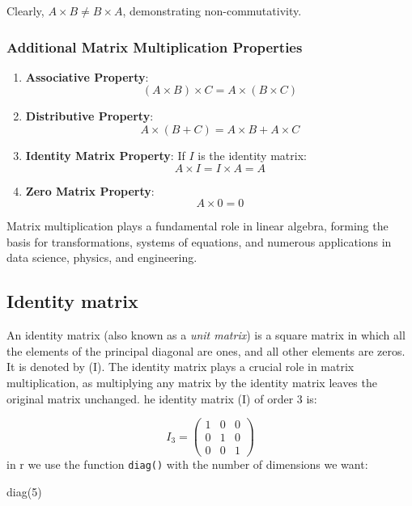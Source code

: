 \documentclass[
  letterpaper,
  DIV=11,
  numbers=noendperiod]{scrartcl}
\newenvironment{Shaded}{\begin{snugshade}}{\end{snugshade}}
\newcommand{\DecValTok}[1]{\textcolor[rgb]{0.68,0.00,0.00}{#1}}
\newcommand{\FunctionTok}[1]{\textcolor[rgb]{0.28,0.35,0.67}{#1}}
\newcommand{\NormalTok}[1]{\textcolor[rgb]{0.00,0.23,0.31}{#1}}
\providecommand{\tightlist}{%
  \setlength{\itemsep}{0pt}\setlength{\parskip}{0pt}}
\begin{document}
Clearly, \(A \times B \neq B \times A\), demonstrating
non-commutativity.

\subsubsection{\texorpdfstring{\textbf{Additional Matrix Multiplication
Properties}}{Additional Matrix Multiplication Properties}}\label{additional-matrix-multiplication-properties}

\begin{enumerate}
\def\labelenumi{\arabic{enumi}.}
\tightlist
\item
  \textbf{Associative Property}:
  \[ (A \times B) \times C = A \times (B \times C) \]
\item
  \textbf{Distributive Property}:
  \[ A \times (B + C) = A \times B + A \times C \]
\item
  \textbf{Identity Matrix Property}: If \(I\) is the identity matrix:
  \[ A \times I = I \times A = A \]
\item
  \textbf{Zero Matrix Property}: \[ A \times 0 = 0 \]
\end{enumerate}

Matrix multiplication plays a fundamental role in linear algebra,
forming the basis for transformations, systems of equations, and
numerous applications in data science, physics, and engineering.

\subsection{Identity matrix}\label{identity-matrix}

An identity matrix (also known as a \emph{unit matrix}) is a square
matrix in which all the elements of the principal diagonal are ones, and
all other elements are zeros. It is denoted by (I). The identity matrix
plays a crucial role in matrix multiplication, as multiplying any matrix
by the identity matrix leaves the original matrix unchanged. he identity
matrix (I) of order 3 is:

\[
I_3 = \begin{pmatrix}
1 & 0 & 0 \\
0 & 1 & 0 \\
0 & 0 & 1
\end{pmatrix}
\] in r we use the function \texttt{diag()} with the number of
dimensions we want:

\begin{Shaded}
\begin{Highlighting}[]
\FunctionTok{diag}\NormalTok{(}\DecValTok{5}\NormalTok{)}
\end{Highlighting}
\end{Shaded}
\end{document}
